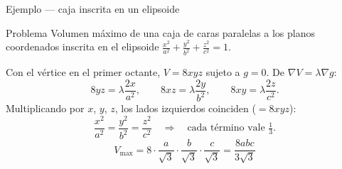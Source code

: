 \documentclass[11pt,aspectratio=169]{beamer}
\begin{document}
\begin{frame}{Ejemplo --- caja inscrita en un elipsoide}
  \begin{block}{Problema}
    Volumen máximo de una caja de caras paralelas a los planos coordenados inscrita en el elipsoide $\frac{x^2}{a^2}+\frac{y^2}{b^2}+\frac{z^2}{c^2}=1$.
  \end{block}
  \pause
  Con el vértice en el primer octante, $V=8xyz$ sujeto a $g=0$. De $\nabla V=\lambda\nabla g$:
  \[
    8yz=\lambda\frac{2x}{a^2},\qquad 8xz=\lambda\frac{2y}{b^2},\qquad 8xy=\lambda\frac{2z}{c^2}.
  \]
  \pause
  Multiplicando por $x$, $y$, $z$, los lados izquierdos coinciden ($=8xyz$):
  \[
    \frac{x^2}{a^2}=\frac{y^2}{b^2}=\frac{z^2}{c^2}
    \quad\Longrightarrow\quad
    \text{cada término vale }\tfrac13.
  \]
  \pause
  \vspace{-6pt}
  \[
    \boxed{V_{\max}=8\cdot\frac{a}{\sqrt3}\cdot\frac{b}{\sqrt3}\cdot\frac{c}{\sqrt3}=\frac{8abc}{3\sqrt3}}
  \]
\end{frame}
\end{document}
